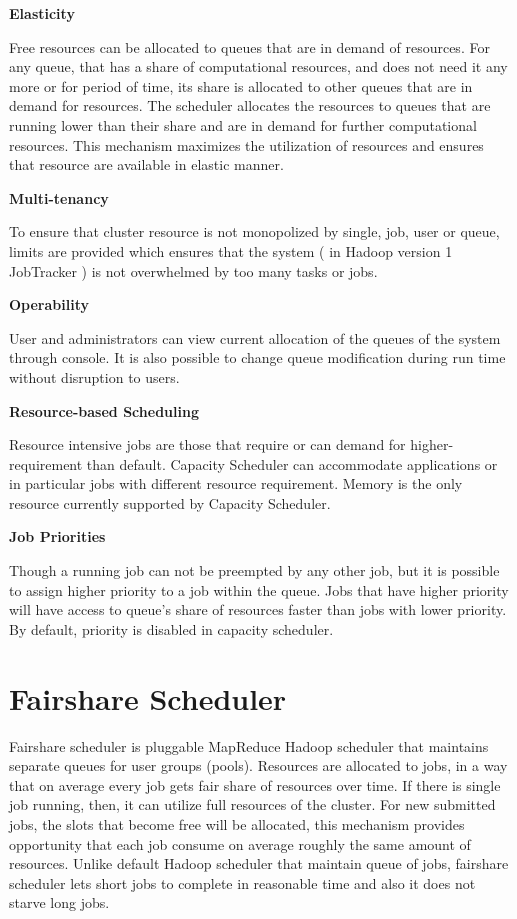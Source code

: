 \textbf{Elasticity }

Free resources can be allocated to queues that are in demand of resources. For any queue, that has a share of computational resources, and does not need it any more or for period of time, its share is allocated to other queues that are in demand for resources. The scheduler allocates the resources to queues that are running lower than their share and are in demand for further computational resources. This mechanism maximizes the utilization of resources and ensures that resource are available in elastic manner. 


\textbf{Multi-tenancy }

To ensure that cluster resource is not monopolized by single, job, user or queue, limits are provided which ensures that the system ( in Hadoop version 1 JobTracker ) is not overwhelmed by too many tasks or jobs. 

\textbf{Operability }

User and administrators can view current allocation of the queues of the system through console. It is also possible to change queue modification during run time without disruption to users. 


\textbf{Resource-based Scheduling }

Resource intensive jobs are those that require or can demand for higher-requirement than default. Capacity Scheduler can accommodate applications or in particular jobs with different resource requirement. Memory is the only resource currently supported by Capacity Scheduler. 

\textbf{Job Priorities }

Though a running job can not be preempted by any other job, but it is possible to assign higher priority to a job within the queue. Jobs that have higher priority will have access to queue's share of resources faster than jobs with lower priority. By default, priority is disabled in capacity scheduler.\cite{capacity} 


\section{Fairshare Scheduler}

Fairshare scheduler is pluggable MapReduce Hadoop scheduler that maintains separate queues for user groups (pools). Resources are allocated to jobs, in a way that on average every job gets fair share of resources over time. If there is single job running, then, it can utilize full resources of the cluster. For new submitted jobs, the slots that become free will be allocated, this mechanism provides opportunity that each job consume on average roughly the same amount of resources. Unlike default Hadoop scheduler that maintain queue of jobs, fairshare scheduler lets short jobs to complete in reasonable time and also it does not starve long jobs.  \cite{dynamic} \cite{fair}

